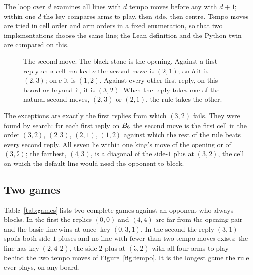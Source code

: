 \documentclass[11pt]{amsart}
\theoremstyle{definition}
\theoremstyle{remark}
\begin{document}
The loop over $d$ examines all lines with $d$ tempo moves before any
with $d+1$; within one $d$ the key compares arms to play, then side,
then centre. Tempo moves are tried in cell order and arm orders in a
fixed enumeration, so that two implementations choose the same line;
the Lean definition and the Python twin are compared on this.

\begin{figure}[ht]
\centering
{}
\caption{The second move. The black stone is the opening. Against a
first reply on a cell marked $a$ the second move is $(2,1)$; on $b$ it
is $(2,3)$; on $c$ it is $(1,2)$. Against every other first reply, on
this board or beyond it, it is $(3,2)$. When the reply takes one of
the natural second moves, $(2,3)$ or $(2,1)$, the rule takes the
other.}
\label{fig:second}
\end{figure}

The exceptions are exactly the first replies from which $(3,2)$ fails.
They were found by search: for each first reply on $B_6$ the
second move is the first cell in the order $(3,2)$, $(2,3)$, $(2,1)$,
$(1,2)$ against which the rest of the rule beats every second reply.
All seven lie within one king's move of the opening or of $(3,2)$; the
farthest, $(4,3)$, is a diagonal of the side-$1$ plus at $(3,2)$, the
cell on which the default line would need the opponent to block.

\subsection{Two games}

Table~\ref{tab:games} lists two complete games against an opponent
who always blocks. In the first the replies $(0,0)$ and $(4,4)$ are
far from the opening pair and the basic line wins at once, key
$(0,3,1)$. In the second the reply $(3,1)$ spoils both side-$1$
pluses and no line with fewer than two tempo moves exists; the line
has key $(2,4,2)$, the side-$2$ plus at $(3,2)$ with all four arms to
play behind the two tempo moves of Figure~\ref{fig:tempo}. It is the
longest game the rule ever plays, on any board.
\end{document}

